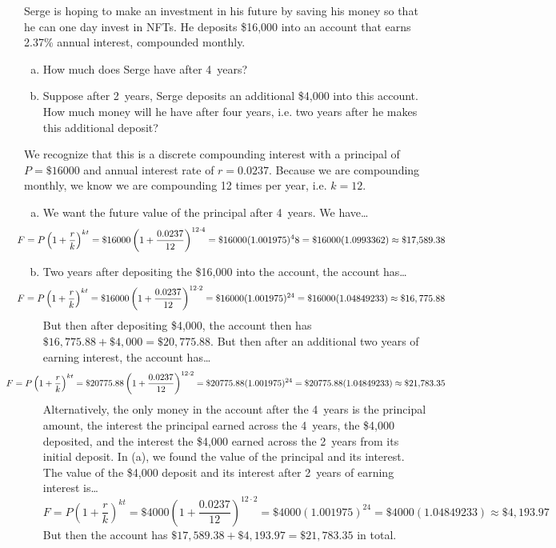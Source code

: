 \documentclass[11pt,letterpaper]{article}
\begin{document}

 Serge is hoping to make an investment in his future by saving his money so that he can one day invest in NFTs. He deposits \$16,000 into an account that earns 2.37\% annual interest, compounded monthly.
	\begin{enumerate}[(a)]
	\item How much does Serge have after 4~years?
	\item Suppose after 2~years, Serge deposits an additional \$4,000 into this account. How much money will he have after four years, i.e. two years after he makes this additional deposit? 
	\end{enumerate} \pspace

\sol We recognize that this is a discrete compounding interest with a principal of $P= \$16000$ and annual interest rate of $r= 0.0237$. Because we are compounding monthly, we know we are compounding 12 times per year, i.e. $k= 12$. 
\begin{enumerate}[(a)]
\item We want the future value of the principal after 4~years. We have\dots
	\[
	\hspace{-1cm} F= P \left(1 + \dfrac{r}{k} \right)^{kt}= \$16000 \left(1 + \dfrac{0.0237}{12} \right)^{12 \cdot 4}= \$16000 (1.001975)^48= \$16000 (1.0993362) \approx \$17,\!589.38
	\] \pspace

\item Two years after depositing the \$16,000 into the account, the account has\dots
	\[
	\hspace{-1cm} F= P \left(1 + \dfrac{r}{k} \right)^{kt}= \$16000 \left(1 + \dfrac{0.0237}{12} \right)^{12 \cdot 2}= \$16000 (1.001975)^{24}= \$16000 (1.04849233) \approx \$16,775.88
	\]
But then after depositing \$4,000, the account then has $\$16,775.88 + \$4,000= \$20,775.88$. But then after an additional two years of earning interest, the account has\dots
	\[
	\hspace{-1.5cm} F= P \left(1 + \dfrac{r}{k} \right)^{kt}= \$20775.88 \left(1 + \dfrac{0.0237}{12} \right)^{12 \cdot 2}= \$20775.88 (1.001975)^{24}= \$20775.88(1.04849233) \approx \$21,\!783.35
	\]
Alternatively, the only money in the account after the 4~years is the principal amount, the interest the principal earned across the 4~years, the \$4,000 deposited, and the interest the \$4,000 earned across the 2~years from its initial deposit. In (a), we found the value of the principal and its interest. The value of the \$4,000 deposit and its interest after 2~years of earning interest is\dots
	\[
	F= P \left(1 + \dfrac{r}{k} \right)^{kt}= \$4000 \left(1 + \dfrac{0.0237}{12} \right)^{12 \cdot 2}= \$4000 (1.001975)^{24}= \$4000 (1.04849233) \approx \$4,\!193.97
	\]
But then the account has $\$17,589.38 + \$4,193.97= \$21,783.35$ in total. 
\end{enumerate}
\end{document}
